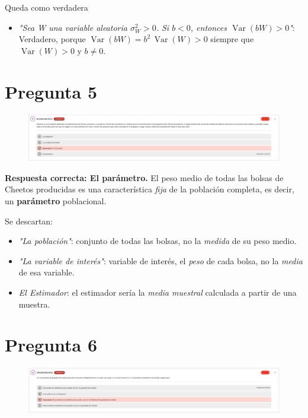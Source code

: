 \documentclass[10pt]{article}
\DeclareMathOperator{\Var}{Var}
\begin{document}
Queda como verdadera
\begin{itemize}
    \item \textit{"Sea W una variable aleatoria \(\sigma_W^2>0\). Si \(b<0\), entonces \(\Var(bW)>0\)"}:\\ Verdadero, porque \(\Var(bW)=b^2\,\Var(W)>0\) siempre que \(\Var(W)>0\) y \(b\neq0\).
\end{itemize}
\section{Pregunta 5}
\begin{figure}[H]
    \centering
    \includegraphics[width=1\textwidth]{images/pregunta5.png}
\end{figure}

\textbf{Respuesta correcta: El parámetro.}  
El peso medio de todas las bolsas de Cheetos producidas es una característica \emph{fija} de la población completa, es decir, un \textbf{parámetro} poblacional.

Se descartan:
\begin{itemize}
    \item \textit{"La población"}: conjunto de todas las bolsas, no la \emph{medida} de su peso medio.
    \item \textit{"La variable de interés"}: variable de interés, el \emph{peso} de cada bolsa, no la \emph{media} de esa variable.
    \item \textit{El Estimador}: el estimador sería la \emph{media muestral} calculada a partir de una muestra.
\end{itemize}
\section{Pregunta 6}
\begin{figure}[H]
    \centering
    \includegraphics[width=1\textwidth]{images/pregunta6.png}
\end{figure}
\end{document}
